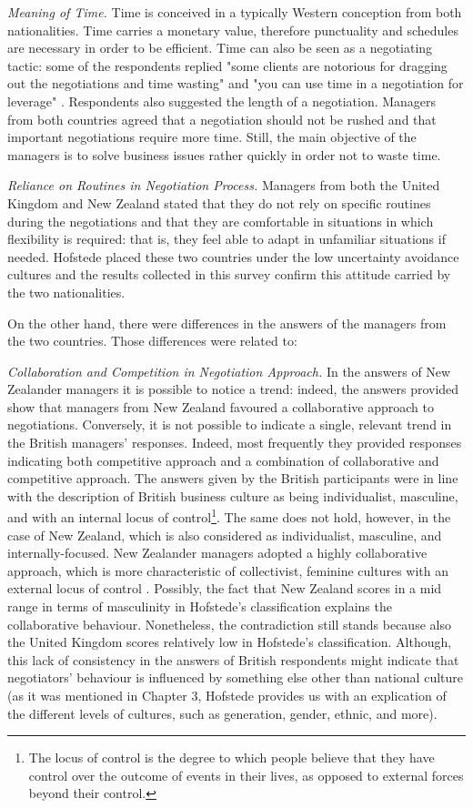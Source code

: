 \documentclass[../main.tex]{subfiles}
\begin{document}
\textit{Meaning of Time.} Time is conceived in a typically Western conception from both nationalities. Time carries a monetary value, therefore punctuality and schedules are necessary in order to be efficient. Time can also be seen as a negotiating tactic: some of the respondents replied "some clients are notorious for dragging out the negotiations and time wasting" and "you can use time in a negotiation for leverage" \mancite\autocite[13]{zueva}. Respondents also suggested the length of a negotiation. Managers from both countries agreed that a negotiation should not be rushed and that important negotiations require more time. Still, the main objective of the managers is to solve business issues rather quickly in order not to waste time. 

\textit{Reliance on Routines in Negotiation Process.} Managers from both the United Kingdom and New Zealand stated that they do not rely on specific routines during the negotiations and that they are comfortable in situations in which flexibility is required: that is, they feel able to adapt in unfamiliar situations if needed. Hofstede placed these two countries under the low uncertainty avoidance cultures and the results collected in this survey confirm this attitude carried by the two nationalities.

On the other hand, there were differences in the answers of the managers from the two countries. Those differences were related to:

\textit{Collaboration and Competition in Negotiation Approach.} In the answers of New Zealander managers it is possible to notice a trend: indeed, the answers provided show that managers from New Zealand favoured a collaborative approach to negotiations. Conversely, it is not possible to indicate a single, relevant trend in the British managers' responses. Indeed, most frequently they provided responses indicating both competitive approach and a combination of collaborative and competitive approach. The answers given by the British participants were in line with the description of British business culture as being individualist, masculine, and with an internal locus of control\footnote{The locus of control is the degree to which people believe that they have control over the outcome of events in their lives, as opposed to external forces beyond their control.}. The same does not hold, however, in the case of New Zealand, which is also considered as individualist, masculine, and internally-focused. New Zealander managers adopted a highly collaborative approach, which is more characteristic of collectivist, feminine cultures with an external locus of control \mancite\autocite[14]{zueva}. Possibly, the fact that New Zealand scores in a mid range in terms of masculinity in Hofstede's classification explains the collaborative behaviour. Nonetheless, the contradiction still stands because also the United Kingdom scores relatively low in Hofstede's classification. Although, this lack of consistency in the answers of British respondents might indicate that negotiators' behaviour is influenced by something else other than national culture (as it was mentioned in Chapter 3, Hofstede provides us with an explication of the different levels of cultures, such as generation, gender, ethnic, and more).
\end{document}
